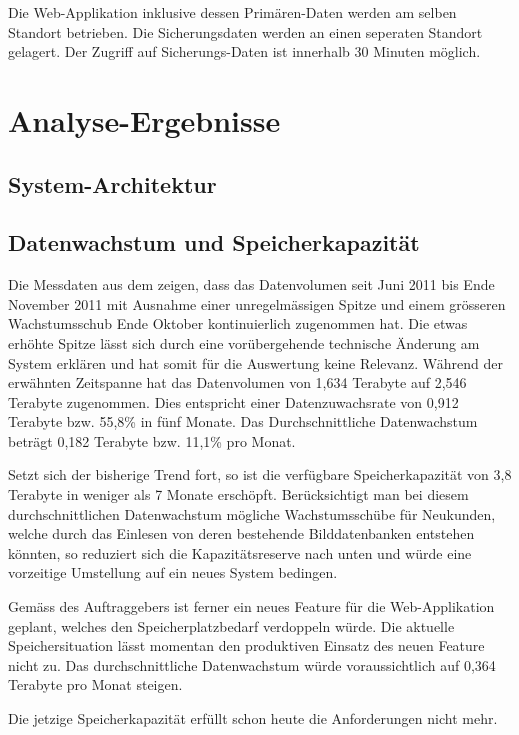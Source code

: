Die Web-Applikation inklusive dessen \gls{Primären-Daten} werden am selben Standort betrieben. Die Sicherungsdaten werden an einen seperaten Standort gelagert. Der Zugriff auf Sicherungs-Daten ist innerhalb 30 Minuten möglich.

\section{Analyse-Ergebnisse}

\subsection{System-Architektur}

\subsection{Datenwachstum und Speicherkapazität}
Die Messdaten aus dem   zeigen, dass das Datenvolumen seit  Juni 2011 bis Ende November 2011 mit Ausnahme einer unregelmässigen Spitze und einem grösseren Wachstumsschub Ende Oktober kontinuierlich zugenommen hat. Die etwas erhöhte Spitze lässt sich durch eine vorübergehende technische Änderung am System erklären und hat somit für die Auswertung keine Relevanz. Während der erwähnten Zeitspanne hat das Datenvolumen von 1,634 Terabyte auf 2,546 Terabyte zugenommen. Dies entspricht einer Datenzuwachsrate von 0,912 Terabyte bzw. 55,8\% in fünf Monate. Das Durchschnittliche Datenwachstum beträgt 0,182 Terabyte bzw. 11,1\% pro Monat.

Setzt sich der bisherige Trend fort, so ist die verfügbare Speicherkapazität von 3,8 Terabyte in weniger als 7 Monate erschöpft. Berücksichtigt man bei diesem durchschnittlichen Datenwachstum mögliche Wachstumsschübe für Neukunden, welche durch das Einlesen von deren bestehende Bilddatenbanken entstehen könnten, so reduziert sich die Kapazitätsreserve nach unten und würde eine vorzeitige Umstellung auf ein neues System bedingen.

Gemäss des Auftraggebers ist ferner ein neues Feature für die Web-Applikation geplant, welches den Speicherplatzbedarf verdoppeln würde. Die aktuelle Speichersituation lässt momentan den produktiven Einsatz des neuen Feature nicht zu. Das durchschnittliche Datenwachstum würde voraussichtlich auf 0,364 Terabyte pro Monat steigen.

Die jetzige Speicherkapazität erfüllt schon heute die Anforderungen nicht mehr.


